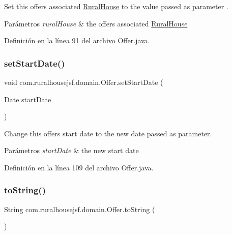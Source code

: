 Set this offers associated \mbox{\hyperlink{a00188}{Rural\+House}} to the value passed as parameter . 


\begin{DoxyParams}{Parámetros}
{\em rural\+House} & the offers associated \mbox{\hyperlink{a00188}{Rural\+House}} \\
\hline
\end{DoxyParams}


Definición en la línea 91 del archivo Offer.\+java.

\mbox{\label{a00184_ad829c57ed6d018c673d4fff942757ed4}} 
\subsubsection{\texorpdfstring{setStartDate()}{setStartDate()}}
{\footnotesize\ttfamily void com.\+ruralhousejsf.\+domain.\+Offer.\+set\+Start\+Date (\begin{DoxyParamCaption}\item[{Date}]{start\+Date }\end{DoxyParamCaption})}



Change this offers start date to the new date passed as parameter. 


\begin{DoxyParams}{Parámetros}
{\em start\+Date} & the new start date \\
\hline
\end{DoxyParams}


Definición en la línea 109 del archivo Offer.\+java.

\mbox{\label{a00184_a91920170708c786730b8707d51d5a810}} 
\subsubsection{\texorpdfstring{toString()}{toString()}}
{\footnotesize\ttfamily String com.\+ruralhousejsf.\+domain.\+Offer.\+to\+String (\begin{DoxyParamCaption}{ }\end{DoxyParamCaption})}



